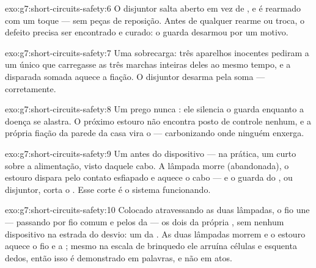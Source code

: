 \begin{solution}{exo:g7:short-circuits-safety:6}
O disjuntor salta aberto em vez de , e é rearmado com um
toque --- sem peças de reposição. Antes de qualquer rearme ou troca,
o defeito precisa ser encontrado e curado: o guarda desarmou por um
motivo.
\end{solution}

\begin{solution}{exo:g7:short-circuits-safety:7}
Uma sobrecarga: três aparelhos inocentes pediram a um único  que
carregasse as três marchas inteiras deles ao mesmo tempo, e a
disparada somada aquece a fiação. O disjuntor desarma pela soma ---
corretamente.
\end{solution}

\begin{solution}{exo:g7:short-circuits-safety:8}
Um prego nunca : ele silencia o guarda enquanto a doença se
alastra. O próximo estouro não encontra posto de controle nenhum, e a
própria fiação da parede da casa vira o  --- carbonizando onde
ninguém enxerga.
\end{solution}

\begin{solution}{exo:g7:short-circuits-safety:9}
Um  antes do dispositivo --- na prática, um curto sobre
a alimentação, visto daquele cabo. A lâmpada morre (abandonada), o
estouro dispara pelo contato esfiapado e aquece o cabo --- e o guarda
do ,  ou disjuntor, corta o . Esse corte é o sistema
funcionando.
\end{solution}

\begin{solution}{exo:g7:short-circuits-safety:10}
Colocado atravessando as duas lâmpadas, o fio une --- passando por
fio comum e pelos  da  --- os dois  da própria
, sem nenhum dispositivo na estrada do desvio: um 
da . As duas lâmpadas morrem e o estouro aquece o fio e a ;
mesmo na escala de brinquedo ele arruína células e esquenta dedos,
então isso é demonstrado em palavras, e não em atos.
\end{solution}

